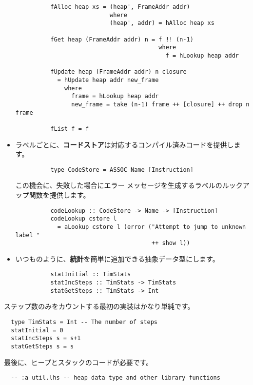 \documentclass{jarticle}
\begin{document}
\begin{itemize}
\begin{verbatim}
          fAlloc heap xs = (heap', FrameAddr addr)
                           where
                           (heap', addr) = hAlloc heap xs

          fGet heap (FrameAddr addr) n = f !! (n-1)
                                         where
                                           f = hLookup heap addr

          fUpdate heap (FrameAddr addr) n closure
            = hUpdate heap addr new_frame
              where
                frame = hLookup heap addr
                new_frame = take (n-1) frame ++ [closure] ++ drop n frame

          fList f = f
        \end{verbatim}
	\item ラベルごとに、\textbf{コードストア}は対応するコンパイル済みコードを提供します。
	      \begin{verbatim}
          type CodeStore = ASSOC Name [Instruction]
        \end{verbatim}
	      この機会に、失敗した場合にエラー メッセージを生成するラベルのルックアップ関数を提供します。
	      \begin{verbatim}
          codeLookup :: CodeStore -> Name -> [Instruction]
          codeLookup cstore l
            = aLookup cstore l (error ("Attempt to jump to unknown label "
                                       ++ show l))
        \end{verbatim}
	\item いつものように、\textbf{統計}を簡単に追加できる抽象データ型にします。
	      \begin{verbatim}
          statInitial :: TimStats
          statIncSteps :: TimStats -> TimStats
          statGetSteps :: TimStats -> Int
        \end{verbatim}
\end{itemize}

ステップ数のみをカウントする最初の実装はかなり単純です。

\begin{verbatim}
  type TimStats = Int -- The number of steps
  statInitial = 0
  statIncSteps s = s+1
  statGetSteps s = s
\end{verbatim}

最後に、ヒープとスタックのコードが必要です。

\begin{verbatim}
  -- :a util.lhs -- heap data type and other library functions
\end{verbatim}
\end{document}
